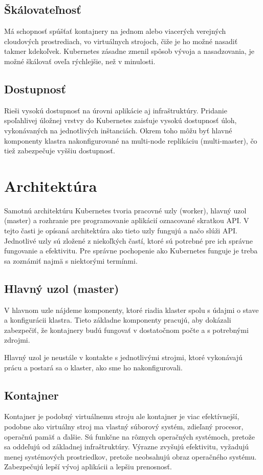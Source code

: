 \subsection*{Škálovateľnosť}
Má schopnosť spúšťať kontajnery na jednom alebo viacerých verejných cloudových prostrediach, vo virtuálnych strojoch, čiže je ho možné nasadiť takmer kdekoľvek. Kubernetes zásadne zmenil spôsob vývoja a nasadzovania, je možné škálovať oveľa rýchlejšie, než v minulosti.

\subsection*{Dostupnosť}
Rieši vysokú dostupnosť na úrovni aplikácie aj infraštruktúry. Pridanie spoľahlivej úložnej vrstvy do Kubernetes zaisťuje vysokú dostupnosť úloh, vykonávaných na jednotlivých inštanciách. Okrem toho môžu byť hlavné komponenty klastra nakonfigurované na multi-node replikáciu (multi-master), čo tiež zabezpečuje vyššiu dostupnosť.

\section{Architektúra}
Samotnú architektúru Kubernetes tvoria pracovné uzly (worker), hlavný uzol (master) a rozhranie pre programovanie aplikácií oznacované skratkou API. V tejto časti je opísaná architektúra ako tieto uzly fungujú a načo slúži API. Jednotlivé uzly sú zložené z niekoľkých častí, ktoré sú potrebné pre ich správne fungovanie a efektivitu. Pre správne pochopenie ako Kubernetes funguje je treba sa zoznámiť najmä s niektorými termínmi.

\subsection{Hlavný uzol (master)}

V hlavnom uzle nájdeme komponenty, ktoré riadia klaster spolu s údajmi o stave a konfigurácii klastra. Tieto základne komponenty pracujú, aby dokázali zabezpečiť, že kontajnery budú fungovať v dostatočnom počte a s potrebnými zdrojmi.

Hlavný uzol je neustále v kontakte s jednotlivými strojmi, ktoré vykonávajú prácu a postará sa o klaster, ako sme ho nakonfigurovali.

\subsection*{Kontajner}
Kontajner je podobný virtuálnemu stroju ale kontajner je viac efektívnejší, podobne ako virtuálny stroj ma vlastný súborový systém, zdieľaný procesor, operačnú pamäť a ďalšie. Sú funkčne na rôznych operačných systémoch, pretože sa oddeľujú od základnej infraštruktúry.\cite{kubernetes}
Výrazne zvyšujú efektivitu, vyžadujú menej systémových prostriedkov, pretože neobsahujú obraz operačného systému. Zabezpečujú lepší vývoj aplikácii a lepšiu prenosnosť.

